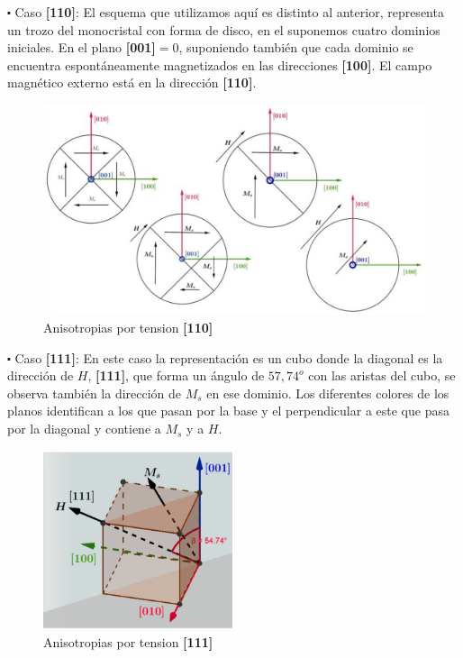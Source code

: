 $\centerdot$ Caso \textbf{[110]}: El esquema que utilizamos aquí es distinto al anterior, representa un trozo del monocristal con forma de disco, en el suponemos cuatro dominios iniciales. En el plano \textbf{[001]}$= 0$, suponiendo también que cada dominio se encuentra espontáneamente magnetizados en las direcciones \textbf{[100]}. El campo magnético externo está en la dirección \textbf{[110]}.


\begin{figure}[H]
    \centering
    \includegraphics[width=1.1\textwidth]{./Figures/anisotropiasPorTension2}
	\caption{Anisotropias por tension \textbf{[110]}}
	\label{fig:anisotropiasPorTension2}
\end{figure}

$\centerdot $ Caso \textbf{[111]}: En este caso la representación es un cubo donde la diagonal es la dirección de $H$, \textbf{[111]}, que forma un ángulo de $57,74^{o}$ con las aristas del cubo, se observa también la dirección de $M_{s}$ en ese dominio. Los diferentes colores de los planos identifican a los que pasan por la base y el perpendicular a este que pasa por la diagonal y contiene a $M_{s}$ y a $H$.

\begin{figure}[H]
    \centering
    \includegraphics[width=0.5\textwidth]{./Figures/anisotropiasPorTension3}
	\caption{Anisotropias por tension \textbf{[111]}}
	\label{fig:anisotropiasPorTension3}
\end{figure}

